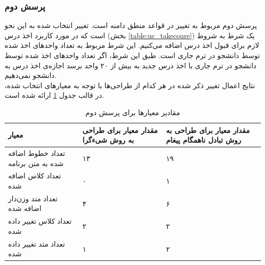 \subsubsection{پرسش دوم}
پرسش دوم مربوط به تغییر در قواعد منطق دامنه است. تغییر انتخاب شده به این نحو است که در مورد کاربرد اخذ درس (بخش \ref{table:uc_takecoure}) یک شرط به شروط لازم برای قبول اخذ درس اضافه می‌کنیم. این شرط مربوط به تعداد واحدهای اخذ شده توسط دانشجو در ترم جاری است. طبق این شرط، اگر تعداد واحدهای اخذ شده توسط دانشجو در ترم جاری با اخذ درس جدید به بیش از ۲۰ واحد برسد اجازه‌ی اخذ درس به دانشجو نمی‌دهیم.\\
نتایج اعمال تغییر ذکر شده در هر کدام از طراحی‌ها با توجه به معیارهای انتخاب شده، در قالب جدول \ref{table:mod_result_2} ارائه شده است.


\begin{table}[ht]
\small
\begin{center}
\begin{tabular}{|p{7cm}|p{4cm}|p{4cm}|}
	\hline
\textbf{معیار} & \textbf{مقدار معیار برای طراحی به روش شیءگرا} & \textbf{مقدار معیار برای طراحی به روش تبادل ناهمگام پیغام} 
\\ 
	\hline
	تعداد خطوط اضافه شده به متن برنامه
	 &
	۱۳
	 &
	 ۱۹
\\
	\hline
	تعداد کلاس اضافه شده
	 &
	 ۰
	 &
	 ۱
\\
	\hline
	تعداد متد وزن‌دار اضافه شده
	 &
	 ۴
	 &
	 ۶
\\
	\hline

	تعداد کلاس تغییر داده شده
	 &
	۲
	 &
	 ۲
\\
	\hline

	تعداد متد تغییر داده شده
	 &
	۱
	 &
	 ۲
\\
	\hline

\end{tabular}
\caption{\label{table:mod_result_2} مقادیر معیارها برای پرسش دوم}
\end{center}
\end{table}




\FloatBarrier

